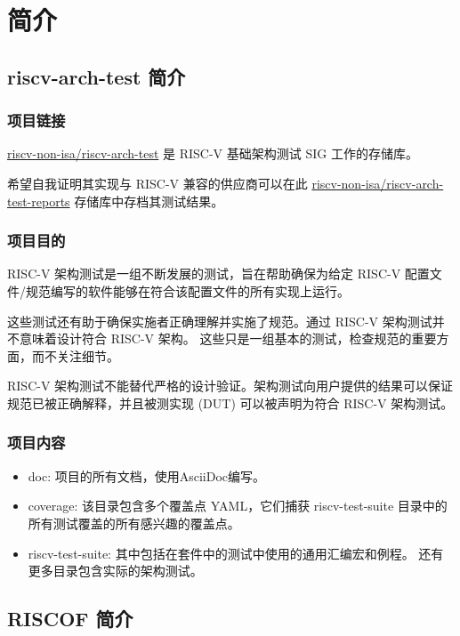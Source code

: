 \documentclass[xcolor=table,dvipsnames,svgnames,aspectratio=169]{ctexbeamer}
\begin{document}
\section{简介}

\subsection{riscv-arch-test 简介}

\begin{frame}
  \frametitle{项目链接}

  \href{https://github.com/riscv-non-isa/riscv-arch-test}{riscv-non-isa/riscv-arch-test} 是 RISC-V 基础架构测试 SIG 工作的存储库。

  希望自我证明其实现与 RISC-V 兼容的供应商可以在此 \href{https://github.com/riscv-non-isa/riscv-arch-test-reports}{riscv-non-isa/riscv-arch-test-reports} 存储库中存档其测试结果。
\end{frame}

\begin{frame}%
  \frametitle{项目目的}
  RISC-V 架构测试是一组不断发展的测试，旨在帮助确保为给定 RISC-V 配置文件/规范编写的软件能够在符合该配置文件的所有实现上运行。

  这些测试还有助于确保实施者正确理解并实施了规范。通过 RISC-V 架构测试并不意味着设计符合 RISC-V 架构。 这些只是一组基本的测试，检查规范的重要方面，而不关注细节。

  RISC-V 架构测试不能替代严格的设计验证。架构测试向用户提供的结果可以保证规范已被正确解释，并且被测实现 (DUT) 可以被声明为符合 RISC-V 架构测试。
\end{frame}

\begin{frame}
  \frametitle{项目内容}
  \begin{itemize}
    \item doc: 项目的所有文档，使用AsciiDoc编写。
    \item coverage: 该目录包含多个覆盖点 YAML，它们捕获 riscv-test-suite 目录中的所有测试覆盖的所有感兴趣的覆盖点。
    \item riscv-test-suite: 其中包括在套件中的测试中使用的通用汇编宏和例程。 还有更多目录包含实际的架构测试。
  \end{itemize}

\end{frame}

\subsection{RISCOF 简介}
\end{document}
